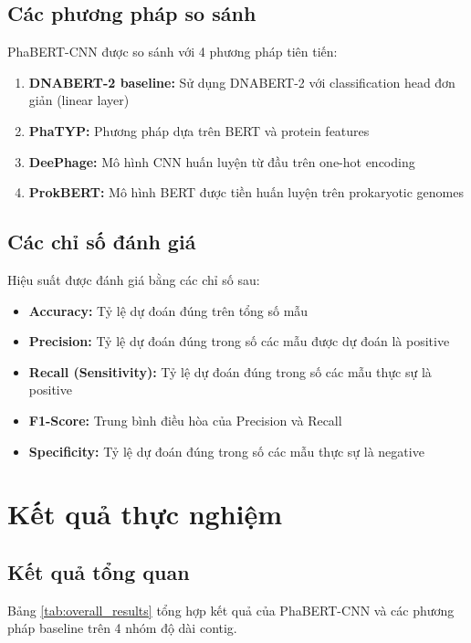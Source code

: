 \subsection{Các phương pháp so sánh}

PhaBERT-CNN được so sánh với 4 phương pháp tiên tiến:

\begin{enumerate}
    \item \textbf{DNABERT-2 baseline:} Sử dụng DNABERT-2 với classification head đơn giản (linear layer)
    \item \textbf{PhaTYP:} Phương pháp dựa trên BERT và protein features
    \item \textbf{DeePhage:} Mô hình CNN huấn luyện từ đầu trên one-hot encoding
    \item \textbf{ProkBERT:} Mô hình BERT được tiền huấn luyện trên prokaryotic genomes
\end{enumerate}

\subsection{Các chỉ số đánh giá}

Hiệu suất được đánh giá bằng các chỉ số sau:

\begin{itemize}
    \item \textbf{Accuracy:} Tỷ lệ dự đoán đúng trên tổng số mẫu
    \item \textbf{Precision:} Tỷ lệ dự đoán đúng trong số các mẫu được dự đoán là positive
    \item \textbf{Recall (Sensitivity):} Tỷ lệ dự đoán đúng trong số các mẫu thực sự là positive
    \item \textbf{F1-Score:} Trung bình điều hòa của Precision và Recall
    \item \textbf{Specificity:} Tỷ lệ dự đoán đúng trong số các mẫu thực sự là negative
\end{itemize}

\section{Kết quả thực nghiệm}
\label{sec:ket_qua_thuc_nghiem}

\subsection{Kết quả tổng quan}

Bảng \ref{tab:overall_results} tổng hợp kết quả của PhaBERT-CNN và các phương pháp baseline trên 4 nhóm độ dài contig.

